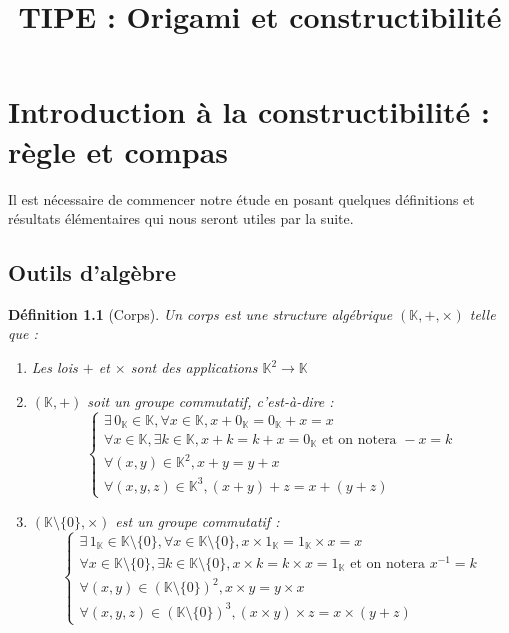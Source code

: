 \documentclass[a4paper,12pt,french]{report}
\title{TIPE : Origami et constructibilité}
\newtheorem{definition}{Définition}[section]
\begin{document}
\maketitle
\renewcommand{\contentsname}{Sommaire}
\tableofcontents{}

\chapter{Introduction à la constructibilité : règle et compas}
		Il est nécessaire de commencer notre étude en posant quelques définitions et résultats élémentaires qui nous seront utiles par la suite.
		\section{Outils d'algèbre}
			
			\begin{definition}[Corps] 
				Un corps est une structure algébrique \( (\mathbb{K} , + , \times ) \) telle que :
				\begin{enumerate}
					\item Les lois \( + \) et \( \times \) sont des applications \( \mathbb{K}^2 \longrightarrow \mathbb{K} \)
					\item \((\mathbb{K} , +)\) soit un groupe commutatif, c'est-à-dire :
						\[ 
							\left\{ 
							\begin{array}{lll}
								\exists \, 0_{\mathbb{K}} \in \mathbb{K} , \forall x \in \mathbb{K}, x + 0_{\mathbb{K}} = 0_{\mathbb{K}} + x = x
								\\
								\forall x \in \mathbb{K} , \exists k \in \mathbb{K} , x + k = k + x = 0_{\mathbb{K}} \mbox{  et on notera } -x = k
								\\
								\forall (x,y) \in \mathbb{K}^{2},
											x + y = y + x
										
								\\
								\forall (x, y, z) \in \mathbb{K}^3, (x + y) + z = x + (y + z)
									 
							\end{array}
							\right.
						\]
					\item \((\mathbb{K}\setminus\{0\}, \times) \) est un groupe commutatif :
						\[ 
								\left\{ 
								\begin{array}{lll}
									\exists \, 1_{\mathbb{K}} \in \mathbb{K}\setminus\{0\} , \forall x \in \mathbb{K}\setminus\{0\}, x \times 1_{\mathbb{K}} = 1_{\mathbb{K}} \times x = x
									\\
									\forall x \in \mathbb{K}\setminus\{0\} , \exists k \in \mathbb{K}\setminus\{0\} , x \times k = k \times x = 1_{\mathbb{K}} \mbox{  et on notera } x^{-1} = k
									\\
									\forall (x,y) \in (\mathbb{K}\setminus\{0\})^{2},
												x \times y = y \times x
									\\
									\forall (x, y, z) \in (\mathbb{K}\setminus\{0\})^3, (x \times y) \times z = x \times (y + z)
										 

\end{array}\]
\end{enumerate}
\end{definition}
\end{document}
